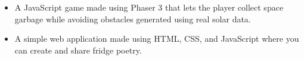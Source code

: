 \begin{itemize}
  \item A JavaScript game made using Phaser 3 that lets the player collect space garbage while avoiding obstacles generated using real solar data.
\end{itemize}
\divider\small

\begin{itemize}
  \item A simple web application made using HTML, CSS, and JavaScript where you can create and share fridge poetry.
\end{itemize}






